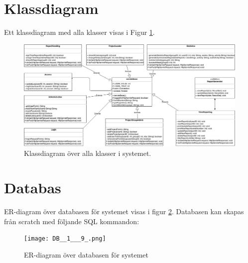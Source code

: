 \documentclass[a4paper]{article}
\begin{document}
\section{Klassdiagram}
Ett klassdiagram med alla klasser visas i Figur \ref{umldiagram}.

\begin{figure}[h!]
\centering
\includegraphics[width=160mm]{UML.jpg}
\caption{Klassdiagram över alla klasser i systemet. \label{umldiagram}}
\end{figure}



\section{Databas}

ER-diagram över databasen för systemet visas i figur \ref{ER}. Databasen kan skapas från scratch med följande SQL kommandon: \\

\begin{figure}[ht!]
\centering
\texttt{[image: DB\_\_1\_\_\_9\_.png]}
\caption{ER-diagram över databasen för systemet \label{ER}}
\end{figure}
\end{document}
